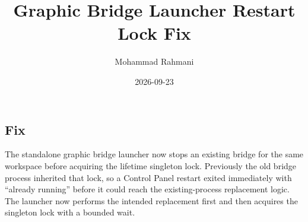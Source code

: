\documentclass[a4paper]{article}
\title{Graphic Bridge Launcher Restart Lock Fix}
\date{2026-09-23}
\author{Mohammad Rahmani}
\begin{document}
   \maketitle

   \begin{preview}
      \section{Fix}
      The standalone graphic bridge launcher now stops an existing bridge for the same workspace before acquiring the lifetime singleton lock. Previously the old bridge process inherited that lock, so a Control Panel restart exited immediately with ``already running'' before it could reach the existing-process replacement logic. The launcher now performs the intended replacement first and then acquires the singleton lock with a bounded wait.
   \end{preview}

   
   
\end{document}
